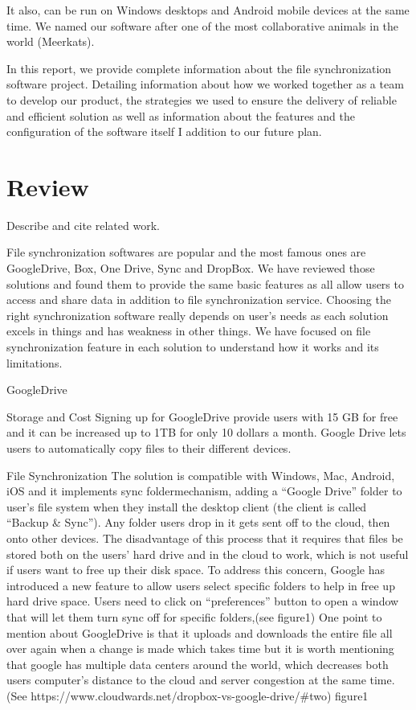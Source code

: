 \documentclass{article}
\begin{document}
It also, can be run on Windows desktops and Android mobile devices at the same time. We named our software after one of the most collaborative animals in the world (Meerkats).

In this report, we provide complete information about the file synchronization software project. Detailing information about how we worked together as a team to develop our product, the strategies we used to ensure the delivery of reliable and efficient solution as well as information about the features and the configuration of the software itself I addition to our future plan.


\section{Review}
Describe and cite related work.


File synchronization softwares are popular and the most famous ones are GoogleDrive, Box, One Drive, Sync and DropBox. We have reviewed those solutions and found them to provide the same basic features as all allow users to access and share data in addition to file synchronization service. Choosing the right synchronization software really depends on user’s needs as each solution excels in things and has weakness in other things. We have focused on file synchronization feature in each solution to understand how it works and its limitations.

GoogleDrive

Storage and Cost
Signing up for GoogleDrive provide users with 15 GB for free and it can be increased up to 1TB for only 10 dollars a month. Google Drive lets users to automatically copy files to their different devices.

File Synchronization
The solution is compatible with Windows, Mac, Android, iOS and it implements sync foldermechanism, adding a “Google Drive” folder to user’s file system when they install the desktop client (the client is called “Backup & Sync”). Any folder users drop in it gets sent off to the cloud, then onto other devices. The disadvantage of this process that it requires that files be stored both on the users’ hard drive and in the cloud to work, which is not useful if users want to free up their disk space. To address this concern, Google has introduced a new feature to allow users select specific folders to help in free up hard drive space. Users need to click on “preferences” button to open a window that will let them turn sync off for specific folders,(see figure1)
One point to mention about GoogleDrive is that it uploads and downloads the entire file all over again when a change is made which takes time but it is worth mentioning that google has multiple data centers around the world, which decreases both users computer’s distance to the cloud and server congestion at the same time. (See https://www.cloudwards.net/dropbox-vs-google-drive/#two)
figure1
\end{document}
